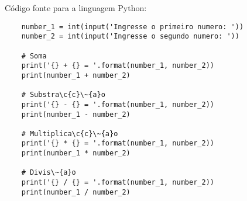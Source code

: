     C\'{o}digo fonte para a linguagem Python:
    \begin{lstlisting}
    number_1 = int(input('Ingresse o primeiro numero: '))
    number_2 = int(input('Ingresse o segundo numero: '))

    # Soma
    print('{} + {} = '.format(number_1, number_2))
    print(number_1 + number_2)

    # Substra\c{c}\~{a}o
    print('{} - {} = '.format(number_1, number_2))
    print(number_1 - number_2)

    # Multiplica\c{c}\~{a}o
    print('{} * {} = '.format(number_1, number_2))
    print(number_1 * number_2)

    # Divis\~{a}o
    print('{} / {} = '.format(number_1, number_2))
    print(number_1 / number_2)
    \end{lstlisting}






